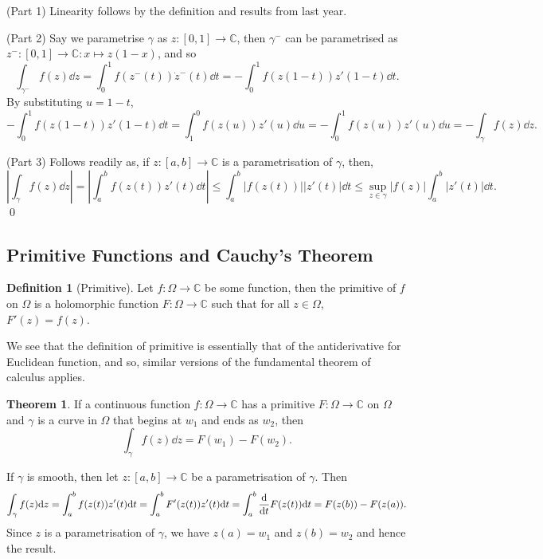 \documentclass[
]{article}
\theoremstyle{definition}
\newtheorem{theorem}{Theorem}
\theoremstyle{definition}
\newtheorem{definition}{Definition}[section]
\begin{document}
(Part 1) Linearity follows by the definition and results from last year.

(Part 2) Say we parametrise \(\gamma\) as \(z : [0, 1] \to \mathbb{C}\),
then \(\gamma^-\) can be parametrised as
\(z^- : [0, 1] \to \mathbb{C} : x \mapsto z(1 - x)\), and so
\[\int_{\gamma^-}f(z) \dd z = \int_0^1 f(z^-(t)) \dot z^- (t) \dd t
    = - \int_0^1 f(z(1 - t)) z'(1 - t) \dd t.\] By substituting
\(u = 1 - t\),
\[- \int_0^1 f(z(1 - t)) z'(1 - t) \dd t = \int_1^0 f(z(u)) z'(u) \dd u
    = - \int_0^1 f(z(u))z'(u) \dd u = - \int_\gamma f(z) \dd z.\]

(Part 3) Follows readily as, if \(z : [a, b] \to \mathbb{C}\) is a
parametrisation of \(\gamma\), then,
\[\left| \int_\gamma f(z) \dd z \right| = \left| \int_a^b f(z(t)) z'(t) \dd t \right|
    \le \int_a^b |f(z(t))| |z'(t)| \dd t 
    \le \sup_{z \in \gamma}|f(z)| \int_a^b |z'(t)| \dd t.\] \qed

\hypertarget{primitive-functions-and-cauchys-theorem}{%
\subsection{Primitive Functions and Cauchy's
Theorem}\label{primitive-functions-and-cauchys-theorem}}

\begin{definition}[Primitive]
  Let \(f : \Omega \to \mathbb{C}\) be some function, then the primitive of \(f\) 
  on \(\Omega\) is a holomorphic function \(F : \Omega \to \mathbb{C}\) such that 
  for all \(z \in \Omega\), \(F'(z) = f(z)\).
\end{definition}

We see that the definition of primitive is essentially that of the
antiderivative for Euclidean function, and so, similar versions of the
fundamental theorem of calculus applies.

\begin{theorem}
  If a continuous function \(f : \Omega \to \mathbb{C}\) has a primitive 
  \(F : \Omega \to \mathbb{C}\) on \(\Omega\) and \(\gamma\) is a curve in 
  \(\Omega\) that begins at \(w_1\) and ends as \(w_2\), then 
  \[\int_\gamma f(z) \dd z = F(w_1) - F(w_2).\]
\end{theorem}
\proof

If \(\gamma\) is smooth, then let \(z : [a, b] \to \mathbb{C}\) be a
parametrisation of \(\gamma\). Then
\[\int_\gamma f(z) \dd z = \int_a^b f(z(t)) z'(t) \dd t = \int_a^b F'(z(t)) z'(t) \dd t
    = \int_a^b \dv{t} F(z(t)) \dd t = F(z(b)) - F(z(a)).\] Since \(z\)
is a parametrisation of \(\gamma\), we have \(z(a) = w_1\) and
\(z(b) = w_2\) and hence the result.
\end{document}
